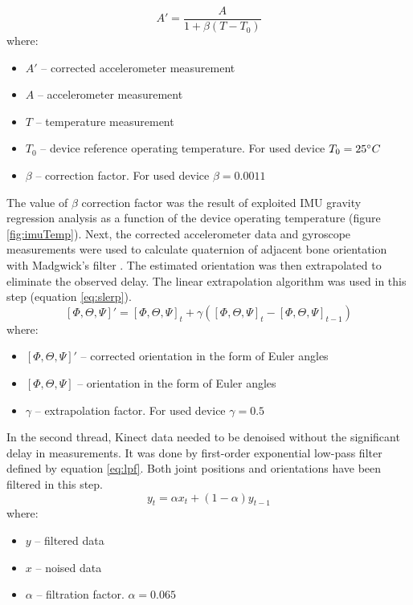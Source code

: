 \documentclass[9pt]{llncs}
\begin{document}
\begin{equation}
	\label{eq:temperatureCompensation}
	A' = \frac{A}{1+\beta(T - T_0)}
\end{equation}
where:
\begin{itemize}
	\item $A'$ -- corrected accelerometer measurement
	\item $A$ -- accelerometer measurement
	\item $T$ -- temperature measurement
	\item $T_0$ -- device reference operating temperature. For used device $T_0 = 25\degree C$
	\item $\beta$ -- correction factor. For used device $\beta = 0.0011$
\end{itemize}

The value of $\beta$ correction factor was the result of exploited IMU gravity regression analysis as a function of the device operating temperature (figure \ref{fig:imuTemp}).
Next, the corrected accelerometer data and gyroscope measurements were used to calculate quaternion of adjacent bone orientation with Madgwick's filter \cite{Madgwick2010}. The estimated orientation was then extrapolated to eliminate the observed delay. The linear extrapolation algorithm was used in this step (equation \ref{eq:slerp}).
\begin{equation}
	\label{eq:slerp}
	[\Phi,\Theta,\Psi]' = [\Phi,\Theta,\Psi]_{t} + \gamma([\Phi,\Theta,\Psi]_{t} - [\Phi,\Theta,\Psi]_{t-1})
\end{equation}
where:
\begin{itemize}
	\item $[\Phi,\Theta,\Psi]'$ -- corrected orientation in the form of Euler angles
	\item $[\Phi,\Theta,\Psi]$ -- orientation in the form of Euler angles
	\item $\gamma$ -- extrapolation factor. For used device $\gamma = 0.5$
\end{itemize}

In the second thread, Kinect data needed to be denoised without the significant delay in measurements. It was done by first-order exponential low-pass filter defined by equation \ref{eq:lpf}. Both joint positions and orientations have been filtered in this step.
\begin{equation}
	\label{eq:lpf}
	y_t = \alpha x_t + (1-\alpha)y_{t-1}
\end{equation}
where:
\begin{itemize}
	\item $y$ -- filtered data
	\item $x$ -- noised data
	\item $\alpha$ -- filtration factor. $\alpha = 0.065$
\end{itemize}
\end{document}
